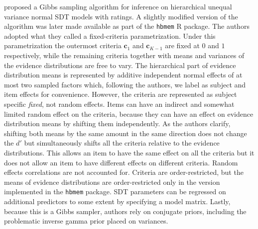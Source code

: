\documentclass[oneside,a4paper]{article}
\begin{document}
 proposed a Gibbs sampling algorithm for
inference on hierarchical unequal variance normal SDT models with
ratings. A slightly modified version of the algorithm was later made
available as part of the \texttt{hbmem} R package. The authors adopted
what they called a fixed-criteria parametrization. Under this
parametrization the outermost criteria $\bm{c}_1$ and $\bm{c}_{K-1}$
are fixed at $0$ and $1$ respectively, while the remaining criteria
together with means and variances of the evidence distributions are
free to vary. The hierarchical part of evidence distribution means is
represented by additive independent normal effects of at most two
sampled factors which, following the authors, we label as subject and
item effects for convenience. However, the criteria are represented as
subject specific \emph{fixed}, not random effects. Items can have an
indirect and somewhat limited random effect on the criteria, because
they can have an effect on evidence distribution means by shifting
them independently. As the authors clarify, shifting both means by the
same amount in the same direction does not change the $d'$ but
simultaneously shifts all the criteria relative to the evidence
distributions. This allows an item to have the same effect on all the
criteria but it does not allow an item to have different effects on
different criteria. Random effects correlations are not accounted
for. Criteria are order-restricted, but the means of evidence
distributions are order-restricted only in the version implemented in
the \texttt{hbmem} package. SDT parameters can be regressed on
additional predictors to some extent by specifying a model
matrix. Lastly, because this is a Gibbs sampler, authors rely on
conjugate priors, including the problematic \cite{gelman2004prior}
inverse gamma prior placed on variances.
\end{document}
